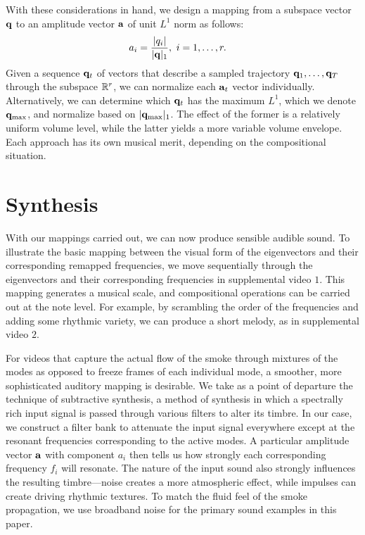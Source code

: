 \documentclass[11pt]{article}
\begin{document}
With these considerations in hand, we design a mapping from a subspace vector $\mathbf{q}$ to an amplitude vector $\mathbf{a}$ of unit $L^1$ norm as follows:
\begin{equation}
\begin{aligned}
a_i &= \frac{\lvert q_i \rvert}{\lvert\mathbf{q}\rvert_1}, \ i = 1, \ldots, r.
\end{aligned}
\end{equation}
Given a sequence ${\mathbf{q}_t}$ of vectors that describe a sampled trajectory $\mathbf{q}_1, \ldots, \mathbf{q}_T$ through the subspace $\mathbb{R}^r$, we can normalize each $\mathbf{a}_t$ vector individually. Alternatively, we can determine which $\mathbf{q}_t$ has the maximum $L^1$, which we denote ${\mathbf{q}}_\textnormal{max}$, and normalize based on $\lvert\mathbf{q}_{\textnormal{max}}\rvert_1$. The effect of the former is a relatively uniform volume level, while the latter yields a more variable volume envelope. Each approach has its own musical merit, depending on the compositional situation.


\section*{Synthesis}

With our mappings carried out, we can now produce sensible audible sound. To illustrate the basic mapping between the visual form of the eigenvectors and their corresponding remapped frequencies, we move sequentially through the eigenvectors and their corresponding frequencies in supplemental video $1$. This mapping generates a musical scale, and compositional operations can be carried out at the note level. For example, by scrambling the order of the frequencies and adding some rhythmic variety, we can produce a short melody, as in supplemental video $2$.

For videos that capture the actual flow of the smoke through mixtures of the modes as opposed to freeze frames of each individual mode, a smoother, more sophisticated auditory mapping is desirable. We take as a point of departure the technique of subtractive synthesis, a method of synthesis in which a spectrally rich input signal is passed through various filters to alter its timbre. In our case, we construct a filter bank to attenuate the input signal everywhere except at the resonant frequencies corresponding to the active modes. A particular amplitude vector $\mathbf{a}$ with component $a_i$ then tells us how strongly each corresponding frequency $f_i$ will resonate. The nature of the input sound also strongly influences the resulting timbre---noise creates a more atmospheric effect, while impulses can create driving rhythmic textures. To match the fluid feel of the smoke propagation, we use broadband noise for the primary sound examples in this paper.
\end{document}
